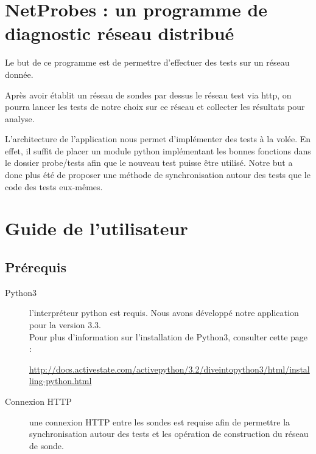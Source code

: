 \documentclass[a4paper,11pt]{article}
\begin{document}


\tableofcontents

\section{NetProbes : un programme de diagnostic réseau distribué}
Le but de ce programme est de permettre d'effectuer des tests sur un réseau donnée.

Après avoir établit un réseau de sondes par dessus le réseau test via http, on pourra lancer les tests de notre choix sur ce réseau et collecter les résultats pour analyse.

L'architecture de l'application nous permet d'implémenter des tests à la volée. En effet, il suffit de placer un module python implémentant les bonnes fonctions dans le dossier probe/tests afin que le nouveau test puisse être utilisé. Notre but a donc plus été de proposer une méthode de synchronisation autour des tests que le code des tests eux-mêmes.

\section{Guide de l'utilisateur}

\subsection{Prérequis}
\begin{description}
\item[Python3] l'interpréteur python est requis. Nous avons développé notre application pour la version 3.3.\\
Pour plus d'information sur l'installation de Python3, consulter cette page :
\begin{center}
\href{http://docs.activestate.com/activepython/3.2/diveintopython3/html/installing-python.html}{http://docs.activestate.com/activepython/3.2/diveintopython3/html/installing-python.html}
\end{center}

\item[Connexion HTTP] une connexion HTTP entre les sondes est requise afin de permettre la synchronisation autour des tests et les opération de construction du réseau de sonde.
\end{description}
\end{document}
